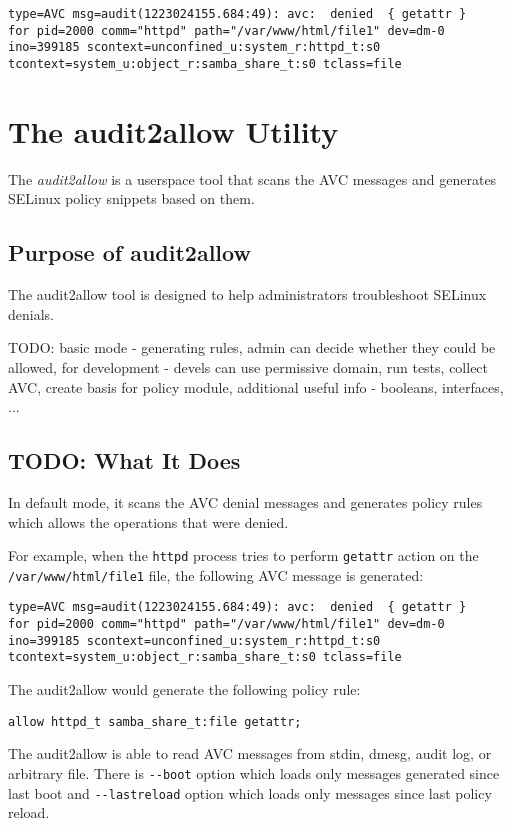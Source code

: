 \begin{lstlisting}
type=AVC msg=audit(1223024155.684:49): avc:  denied  { getattr }
for pid=2000 comm="httpd" path="/var/www/html/file1" dev=dm-0
ino=399185 scontext=unconfined_u:system_r:httpd_t:s0
tcontext=system_u:object_r:samba_share_t:s0 tclass=file
\end{lstlisting}

\section{The audit2allow Utility}
The \emph{audit2allow} is a userspace tool that scans the AVC messages and
generates SELinux policy snippets based on them.

\subsection{Purpose of audit2allow}
The audit2allow tool is designed to help administrators troubleshoot SELinux
denials.

TODO: basic mode - generating rules, admin can decide whether they could be
allowed, for development - devels can use permissive domain, run tests, collect
AVC, create basis for policy module, additional useful info - booleans,
interfaces, ...

\subsection{TODO: What It Does}
In default mode, it scans the AVC denial messages and generates policy rules
which allows the operations that were denied.

For example, when the \texttt{httpd} process tries to perform \texttt{getattr}
action on the \texttt{/var/www/html/file1} file, the following AVC message is
generated:
\begin{lstlisting}
type=AVC msg=audit(1223024155.684:49): avc:  denied  { getattr }
for pid=2000 comm="httpd" path="/var/www/html/file1" dev=dm-0
ino=399185 scontext=unconfined_u:system_r:httpd_t:s0
tcontext=system_u:object_r:samba_share_t:s0 tclass=file
\end{lstlisting}
The audit2allow would generate the following policy rule:
\begin{lstlisting}
allow httpd_t samba_share_t:file getattr;
\end{lstlisting}

The audit2allow is able to read AVC messages from stdin, dmesg, audit log, or
arbitrary file. There is \texttt{-{}-boot} option which loads only messages
generated since last boot and \texttt{-{}-lastreload} option which loads only
messages since last policy reload.

